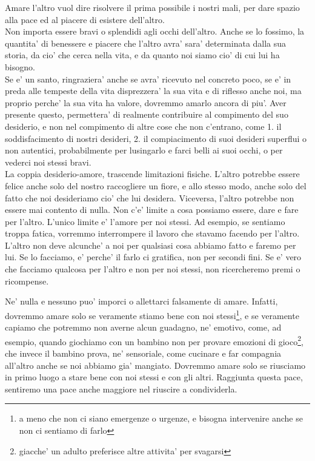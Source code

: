 Amare l'altro vuol dire risolvere il prima possibile i nostri mali, per dare spazio alla pace ed al piacere di esistere dell'altro.\\
Non importa essere bravi o splendidi agli occhi dell'altro. Anche se lo fossimo, la quantita' di benessere e piacere che l'altro avra' sara' determinata dalla sua storia, da cio' che cerca nella vita, e da quanto noi siamo cio' di cui lui ha bisogno.\\
Se e' un santo, ringraziera' anche se avra' ricevuto nel concreto poco, se e' in preda alle tempeste della vita disprezzera' la sua vita e di riflesso anche noi, ma proprio perche' la sua vita ha valore, dovremmo amarlo ancora di piu'.
Aver presente questo, permettera' di realmente contribuire al compimento del suo desiderio, e non nel compimento di altre cose che non c'entrano, come 1. il soddisfacimento di nostri desideri, 2. il compiacimento di suoi desideri superflui o non autentici, probabilmente per lusingarlo e farci belli ai suoi occhi, o per vederci noi stessi bravi.\\
La coppia desiderio-amore, trascende limitazioni fisiche. L'altro potrebbe essere felice anche solo del nostro raccogliere un fiore, e allo stesso modo, anche solo del fatto che noi desideriamo cio' che lui desidera. Viceversa, l'altro potrebbe non essere mai contento di nulla.
Non c'e' limite a cosa possiamo essere, dare e fare per l'altro. L'unico limite e' l'amore per noi stessi. Ad esempio, se sentiamo troppa fatica, vorremmo interrompere il lavoro che stavamo facendo per l'altro.
L'altro non deve alcunche' a noi per qualsiasi cosa abbiamo fatto e faremo per lui. Se lo facciamo, e' perche' il farlo ci gratifica, non per secondi fini. Se e' vero che facciamo qualcosa per l'altro e non per noi stessi, non ricercheremo premi o ricompense.

Ne' nulla e nessuno puo' imporci o allettarci falsamente di amare. Infatti, dovremmo amare solo se veramente stiamo bene con noi stessi\footnote{a meno che non ci siano emergenze o urgenze, e bisogna intervenire anche se non ci sentiamo di farlo}, e se veramente capiamo che potremmo non averne alcun guadagno, ne' emotivo, come, ad esempio, quando giochiamo con un bambino non per provare emozioni di gioco\footnote{giacche' un adulto preferisce altre attivita' per svagarsi}, che invece il bambino prova, ne' sensoriale, come cucinare e far compagnia all'altro anche se noi abbiamo gia' mangiato. Dovremmo amare solo se riusciamo in primo luogo a stare bene con noi stessi e con gli altri. Raggiunta questa pace, sentiremo una pace anche maggiore nel riuscire a condividerla.

